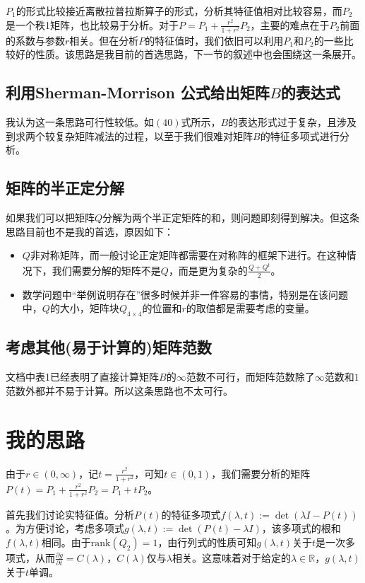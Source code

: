 \documentclass[UTF8]{ctexart}
\theoremstyle{plain}
\theoremstyle{definition}
\theoremstyle{remark}
\newcommand{\pdfFrac}[2]{\frac{\partial #1}{\partial #2}}
\begin{document}
$P_{1}$的形式比较接近离散拉普拉斯算子的形式，分析其特征值相对比较容易，而$P_{2}$是一个秩1矩阵，也比较易于分析。对于$P=P_{1}+\frac{r^{2}}{1+r^2}P_{2}$，主要的难点在于$P_{2}$前面的系数与参数$r$相关。但在分析$P$的特征值时，我们依旧可以利用$P_{1}$和$P_{2}$的一些比较好的性质。该思路是我目前的首选思路，下一节的叙述中也会围绕这一条展开。
\subsection{利用Sherman-Morrison 公式给出矩阵$B$的表达式}
我认为这一条思路可行性较低。如$(40)$式所示，$B$的表达形式过于复杂，且涉及到求两个较复杂矩阵减法的过程，以至于我们很难对矩阵$B$的特征多项式进行分析。
\subsection{矩阵的半正定分解}
如果我们可以把矩阵$Q$分解为两个半正定矩阵的和，则问题即刻得到解决。但这条思路目前也不是我的首选，原因如下：
\begin{itemize}
    \item $Q$非对称矩阵，而一般讨论正定矩阵都需要在对称阵的框架下进行。在这种情况下，我们需要分解的矩阵不是$Q$，而是更为复杂的$\frac{Q+Q^{t}}{2}$。
    \item 数学问题中“举例说明存在”很多时候并非一件容易的事情，特别是在该问题中，$Q$的大小，矩阵块$Q_{4\times 4}$的位置和$r$的取值都是需要考虑的变量。
\end{itemize}
\subsection{考虑其他(易于计算的)矩阵范数}
文档中表1已经表明了直接计算矩阵$B$的$\infty$范数不可行，而矩阵范数除了$\infty$范数和$1$范数外都并不易于计算。所以这条思路也不太可行。
\section{我的思路}
由于$r\in(0,\infty)$，记$t=\frac{r^2}{1+r^2}$，可知$t\in(0,1)$，我们需要分析的矩阵$P(t)=P_{1}+\frac{r^{2}}{1+r^2}P_{2}=P_{1}+tP_{2}$。

首先我们讨论实特征值。分析$P(t)$的特征多项式$f(\lambda,t):=\det(\lambda I-P(t))$。为方便讨论，考虑多项式$g(\lambda,t):=\det(P(t)-\lambda I)$，该多项式的根和$f(\lambda,t)$相同。由于$\text{rank}(Q_{2})=1$，由行列式的性质可知$g(\lambda,t)$关于$t$是一次多项式，从而$\pdfFrac{g}{t}= C(\lambda)$，$C(\lambda)$仅与$\lambda$相关。这意味着对于给定的$\lambda\in\mathbb{R}$，$g(\lambda,t)$关于$t$单调。
\end{document}
